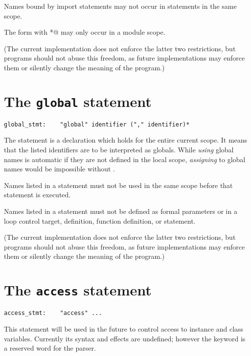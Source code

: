 Names bound by import statements may not occur in \verb@global@
statements in the same scope.

The \verb@from@ form with \verb@*@ may only occur in a module scope.

(The current implementation does not enforce the latter two
restrictions, but programs should not abuse this freedom, as future
implementations may enforce them or silently change the meaning of the
program.)

\section{The {\tt global} statement} \label{global}

\begin{verbatim}
global_stmt:    "global" identifier ("," identifier)*
\end{verbatim}

The \verb@global@ statement is a declaration which holds for the
entire current scope.  It means that the listed identifiers are to be
interpreted as globals.  While {\em using} global names is automatic
if they are not defined in the local scope, {\em assigning} to global
names would be impossible without \verb@global@.

Names listed in a \verb@global@ statement must not be used in the same
scope before that \verb@global@ statement is executed.

Names listed in a \verb@global@ statement must not be defined as formal
parameters or in a \verb@for@ loop control target, \verb@class@
definition, function definition, or \verb@import@ statement.

(The current implementation does not enforce the latter two
restrictions, but programs should not abuse this freedom, as future
implementations may enforce them or silently change the meaning of the
program.)

\section{The {\tt access} statement} \label{access}

\begin{verbatim}
access_stmt:    "access" ...
\end{verbatim}

This statement will be used in the future to control access to
instance and class variables.  Currently its syntax and effects are
undefined; however the keyword \verb@access@ is a reserved word for
the parser.

